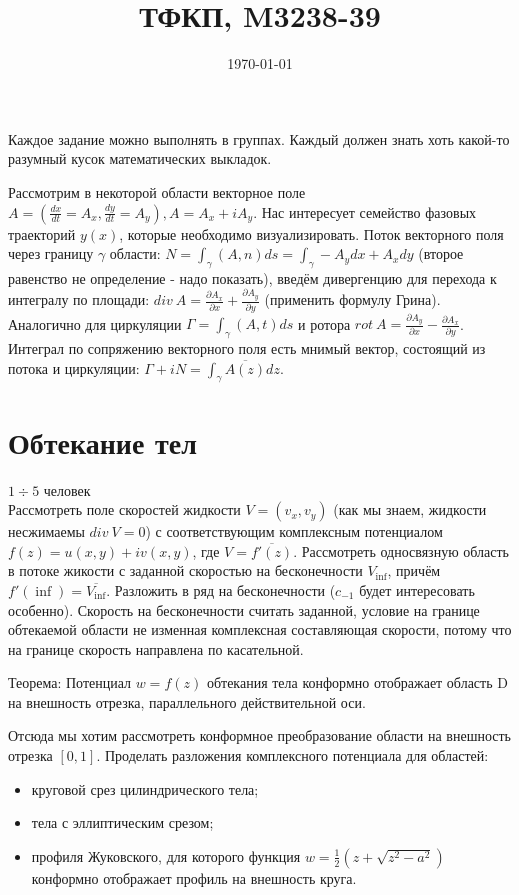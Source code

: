 \documentclass{article}
\title{ТФКП, M3238-39}
\date{\today}
\begin{document}
Каждое задание можно выполнять в группах. Каждый должен знать хоть какой-то разумный кусок математических выкладок.

Рассмотрим в некоторой области векторное поле $A=(\frac{dx}{dt}=A_x, \frac{dy}{dt}=A_y), A=A_x+iA_y$. Нас интересует семейство фазовых траекторий $y(x)$, которые необходимо визуализировать. Поток векторного поля через границу $\gamma$ области: $N = \int_\gamma (A, n)ds = \int_\gamma -A_ydx+A_xdy$ (второе равенство не определение - надо показать), введём дивергенцию для перехода к интегралу по площади: $div~A=\frac{\partial A_x}{\partial x} + \frac{\partial A_y}{\partial y}$ (применить формулу Грина). Аналогично для циркуляции $\Gamma=\int_\gamma (A, t) ds$ и ротора $rot~A=\frac{\partial A_y}{\partial x} - \frac{\partial A_x}{\partial y}$. Интеграл по сопряжению векторного поля есть мнимый вектор, состоящий из потока и циркуляции: $\Gamma+iN=\int_\gamma \overline{A(z)}dz$.

\section*{Обтекание тел}
$1\div5$ человек \\
Рассмотреть поле скоростей жидкости $V=(v_x, v_y)$ (как мы знаем, жидкости несжимаемы $div~V=0$) с соответствующим комплексным потенциалом $f(z)=u(x,y)+iv(x,y)$, где $V=\overline{f'(z)}$. Рассмотреть односвязную область в потоке жикости с заданной скоростью на бесконечности $V_\inf$, причём $f'(\inf) = \overline{V_\inf}$. Разложить в ряд на бесконечности ($c_{-1}$ будет интересовать особенно). Скорость на бесконечности считать заданной, условие на границе обтекаемой области не изменная комплексная составляющая скорости, потому что на границе скорость направлена по касательной. 

Теорема: Потенциал $w = f(z)$ обтекания тела конформно отображает область D на внешность отрезка, параллельного действительной оси.

Отсюда мы хотим рассмотреть конформное преобразование области на внешность отрезка $[0, 1]$. Проделать разложения комплексного потенциала для областей:
\begin{itemize}
\item круговой срез цилиндрического тела;
\item тела с эллиптическим срезом;
\item профиля Жуковского, для которого функция $w=\frac{1}{2}(z+\sqrt{z^2-a^2})$ конформно отображает профиль на внешность круга.
\end{itemize}



\end{document}
